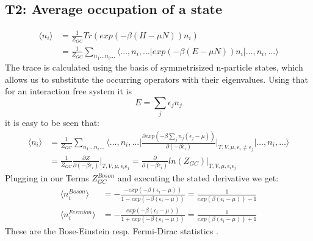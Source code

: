 \documentclass[12pt,a4paper]{scrartcl}
\begin{document}
\subsection{T2: Average occupation of a state}
\begin{align*}
	\langle{ n_i}\rangle &= \frac{1}{Z_{GC}}Tr(exp(-\beta(H-\mu N))n_i)\\
	&= \frac{1}{Z_{GC}}\sum_{n_1 \dots n_i \dots  } \langle \dots,n_i,\dots | exp(-\beta(E-\mu N))n_i| \dots, n_i, \dots 	\rangle
\end{align*}
The trace is calculated using the basis of symmetrisized  n-particle states, which allows us to substitute the occurring operators with their eigenvalues. 
Using that for an interaction free system it is \[ E=\sum_j \epsilon_j n_j \] it is easy to be seen that:
\begin{align*}
	\langle n_i \rangle &= \frac{1}{Z_{GC}}\sum_{n_1 \dots n_i \dots }\bigg\langle \dots , n_i , \dots \bigg| \frac{\partial  	exp(-\beta \sum_j n_j (\epsilon_j-\mu))}{\partial(-\beta \epsilon_i)} \bigg|_{T,V,\mu,\epsilon_i\neq \epsilon_j} 		\bigg| \dots,n_i, \dots \bigg\rangle \\
	&= \frac{1}{Z_{GC}}\frac{\partial Z}{\partial(-\beta \epsilon_i)} \bigg|_{T,V,\mu,\epsilon_i \epsilon_j} = \frac			{\partial }{\partial(-\beta \epsilon_i)} ln(Z_{GC})  \bigg|_{T,V,\mu,\epsilon_i \epsilon_j} 
\end{align*}
Plugging in our Terms $Z_{GC}^{Boson}$ and executing the stated derivative we get:
\begin{align*} 
	\langle n_i^{Boson} \rangle &= -\frac{-exp(-\beta(\epsilon_i-\mu))}{1-exp(-\beta(\epsilon_i-\mu))} = \frac{1}{exp	(\beta(\epsilon_i -\mu))-1} \\
	\langle n_i^{Fermion} \rangle &= -\frac{exp(-\beta(\epsilon_i-\mu))}{1+exp(-\beta(\epsilon_i-\mu))} = \frac{1}{exp	(\beta(\epsilon_i -\mu))+1} 
\end{align*}
These are the Bose-Einstein resp. Fermi-Dirac statistics .
\end{document}
